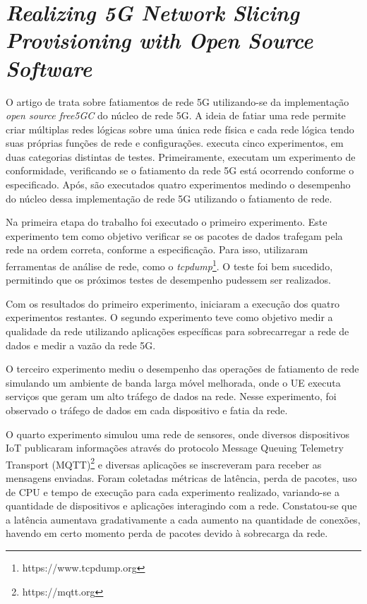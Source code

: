 \section{\textit{Realizing 5G Network Slicing Provisioning with Open Source Software}}

O artigo de  trata sobre fatiamentos de rede 5G utilizando-se da implementação \textit{open source free5GC} do núcleo de rede 5G.
A ideia de fatiar uma rede permite criar múltiplas redes lógicas sobre uma única rede física e cada rede lógica tendo suas próprias funções de rede e configurações.
 executa cinco experimentos, em duas categorias distintas de testes. Primeiramente, executam um experimento de conformidade, verificando se o fatiamento da rede 5G está ocorrendo conforme o especificado. Após, são executados quatro experimentos medindo o desempenho do núcleo dessa implementação de rede 5G utilizando o fatiamento de rede.

Na primeira etapa do trabalho foi executado o primeiro experimento.
Este experimento tem como objetivo verificar se os pacotes de dados trafegam pela rede na ordem correta, conforme a especificação.
Para isso, utilizaram ferramentas de análise de rede, como o \textit{tcpdump}\footnote{https://www.tcpdump.org}.
O teste foi bem sucedido, permitindo que os próximos testes de desempenho pudessem ser realizados.

Com os resultados do primeiro experimento,  iniciaram a execução dos quatro experimentos restantes.
O segundo experimento teve como objetivo medir a qualidade da rede utilizando aplicações específicas para sobrecarregar a rede de dados e medir a vazão da rede 5G.

O terceiro experimento mediu o desempenho das operações de fatiamento de rede simulando um ambiente de banda larga móvel melhorada, onde o UE executa serviços que geram um alto tráfego de dados na rede.
Nesse experimento, foi observado o tráfego de dados em cada dispositivo e fatia da rede.

O quarto experimento simulou uma rede de sensores, onde diversos dispositivos IoT publicaram informações através do protocolo Message Queuing Telemetry Transport (MQTT)\footnote{https://mqtt.org} e diversas aplicações se inscreveram para receber as mensagens enviadas.
Foram coletadas métricas de latência, perda de pacotes, uso de CPU e tempo de execução para cada experimento realizado, variando-se a quantidade de dispositivos e aplicações interagindo com a rede.
Constatou-se que a latência aumentava gradativamente a cada aumento na quantidade de conexões, havendo em certo momento perda de pacotes devido à sobrecarga da rede.


